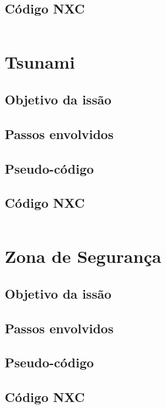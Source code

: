 \documentclass{article}
\begin{document}
	\subsection{Código NXC}
		\begin{tcolorbox}[]
			\inputminted{c}{codes/galho_da_arvore.nxc}
		\end{tcolorbox}

\newpage
\section{Tsunami}
	\subsection{Objetivo da issão}
	\subsection{Passos envolvidos}
	\subsection{Pseudo-código}
	\subsection{Código NXC}
		\begin{tcolorbox}[]
			\inputminted{c}{codes/tsunami.nxc}
		\end{tcolorbox}

\newpage
\section{Zona de Segurança}
	\subsection{Objetivo da issão}
	\subsection{Passos envolvidos}
	\subsection{Pseudo-código}
	\subsection{Código NXC}
		\begin{tcolorbox}[]
			\inputminted{c}{codes/zona_de_seguranca.nxc}
		\end{tcolorbox}
\end{document}
